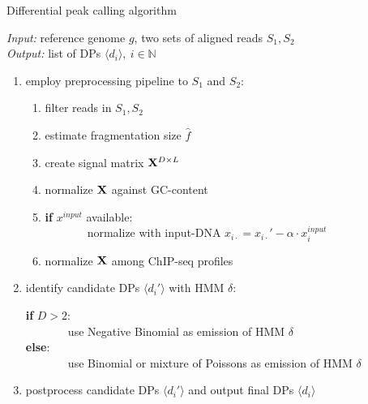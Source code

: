 \begin{algorithm}[ht]
\caption[Differential Peak Calling Algorithm]{Differential peak calling algorithm}
\label{alg_dpc}
\textit{Input:} reference genome $g$, two sets of aligned reads $S_1, S_2$\\
\textit{Output:} list of DPs $\langle d_i \rangle,\ i \in \mathbb{N}$

  \begin{enumerate}[label=\arabic*.]
    \item employ preprocessing pipeline to $S_1$ and $S_2$: 
    \begin{enumerate}[label=1.\arabic*]
     \item filter reads in $S_1, S_2$ 
     \item estimate fragmentation size $\hat{f}$ 
     \item create signal matrix $\mathbf{X}^{D \times L}$ 
     \item normalize $\mathbf{X}$ against GC-content 
     
     \item \textbf{if} $x^{input}$ available: \\ 
     \ $\text{ } \quad \quad \ $ normalize with input-DNA $x_{i\cdot} =x_{i\cdot}' - \alpha \cdot x_i^{input}$ 
     \item normalize $\mathbf{X}$ among ChIP-seq profiles 
    \end{enumerate}
    
    \item identify candidate DPs $\langle d_i' \rangle$ with HMM $\delta$:\\
    \vspace{-5mm}
    
    \textbf{if} $D > 2$: \\
    \ $\text{ } \quad \quad \ $ use Negative Binomial as emission of HMM $\delta$ \\
    \textbf{else}: \\
    \ $\text{ } \quad \quad \ $ use Binomial or mixture of Poissons as emission of HMM $\delta$
    
    \item postprocess candidate DPs $\langle d_i' \rangle$ and output final DPs $\langle d_i \rangle$ 
  \end{enumerate}
\end{algorithm}

